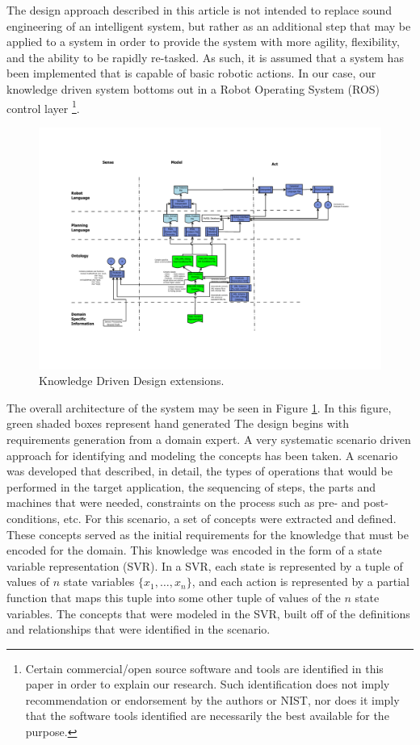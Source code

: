 The design approach described in this article is not intended to
replace sound engineering of an intelligent system, but rather as 
an additional step that may be applied to a system in order to provide
the system with more agility, flexibility, and the ability to be rapidly
re-tasked. As such, it is assumed that a system has been implemented
that is capable of basic robotic actions. In our case, our knowledge
driven system bottoms out in a Robot Operating System (ROS) control layer
\footnote{Certain commercial/open source software and tools are identified 
in this paper in order to explain our research. Such identification does not imply
recommendation or endorsement by the authors or NIST, nor does it 
imply that the software tools identified are necessarily the best available for the purpose.}.
\begin{figure}[ht!]
\begin{center}
\includegraphics[width=16cm]{images/KnowledgeDrivenRobotics.pdf}
\caption{Knowledge Driven Design extensions.}
\label{fig:DesignArchitecture}
\end{center}
\end{figure}

The overall architecture of the system may be seen in Figure \ref{fig:DesignArchitecture}.
In this figure, green shaded boxes represent hand generated
The design begins with requirements generation from a domain expert. 
A very systematic scenario driven approach for identifying and 
modeling the concepts has been taken. A scenario 
was developed that described, in detail, the types of operations that would be performed 
in the target application, the sequencing of steps, the parts and machines that were 
needed, constraints 
on the process such as pre- and post-conditions, etc. For this scenario, a set of 
concepts were extracted and defined. These concepts served as the initial requirements 
for the knowledge that must be encoded for the domain.
This knowledge was encoded in the form of a state variable representation (SVR). 
In a SVR, each state is represented by a tuple of values of $n$ state variables 
$\lbrace x_1,\dots,x_n\rbrace$, and each action is represented by a partial function 
that maps this tuple into some other tuple of values of the $n$ state variables.
The concepts that were modeled in the SVR, built off of the 
definitions and relationships that were identified in the scenario. 

